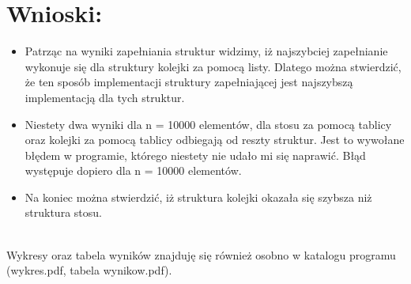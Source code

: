 \documentclass{article}
\begin{document}
\section{Wnioski:}
\begin{itemize}
\item Patrząc na wyniki zapełniania struktur widzimy, iż najszybciej zapełnianie wykonuje
się dla struktury kolejki za pomocą listy. Dlatego można stwierdzić, że ten sposób implementacji
struktury zapełniającej jest najszybszą implementacją dla tych struktur.
\item Niestety dwa wyniki dla n = 10000 elementów, dla stosu za pomocą tablicy oraz kolejki za pomocą tablicy odbiegają od reszty struktur. Jest to wywołane błędem w programie, którego niestety nie udało mi 
się naprawić. Błąd występuje dopiero dla n = 10000 elementów.
\item Na koniec można stwierdzić, iż struktura kolejki okazała się szybsza niż struktura stosu.

\end{itemize}
\\
Wykresy oraz tabela wyników znajduję się również osobno w katalogu programu (wykres.pdf, tabela wynikow.pdf).
\end{document}
